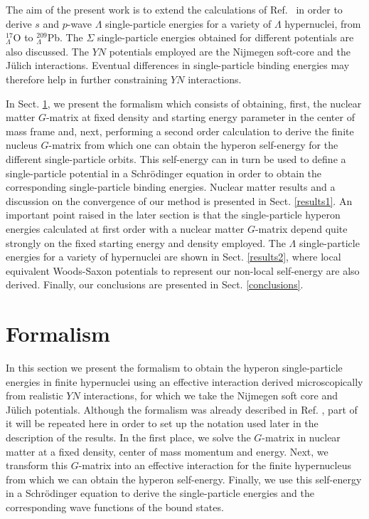 The aim of the present work is 
to extend the calculations 
of Ref.\ \cite{hjort96} in order to derive 
$s$ and $p$-wave $\Lambda$ single-particle energies for a variety of
$\Lambda$ hypernuclei, from $^{17}_{\Lambda}$O 
to $^{209}_{\Lambda}$Pb. The $\Sigma$ single-particle energies obtained for 
different potentials are also
discussed. The $YN$ potentials employed are the Nijmegen soft-core
\cite{nijmegen} and the J\"ulich \cite{juelich} interactions.
Eventual  differences in single-particle binding energies  
may therefore help in further constraining $YN$ interactions.


In Sect. \ref{formal}, we present the formalism which consists of
obtaining, first, the nuclear matter $G$-matrix at fixed density and
starting energy parameter in the center of mass frame and, next,
performing a
second order calculation to derive the finite nucleus $G$-matrix from
which one can obtain the hyperon self-energy for the different
single-particle 
orbits.
This self-energy can in turn be used to define a single-particle
potential in
a Schr\"odinger equation in order to obtain the corresponding single-particle
binding energies. Nuclear matter results and a discussion on the
convergence of our
method is presented in Sect. \ref{results1}. An important point raised in
the later section is that the single-particle hyperon energies calculated
at first order with a nuclear matter $G$-matrix depend quite strongly on 
the fixed starting energy and density employed. The $\Lambda$
single-particle 
energies for a variety of
hypernuclei are shown in Sect. \ref{results2}, where local
equivalent Woods-Saxon potentials to represent our non-local
self-energy are also derived. Finally, our conclusions are presented in
Sect. \ref{conclusions}.   




\section{Formalism}
\label{formal}
In this section we present the formalism to obtain the hyperon single-particle
energies in finite hypernuclei using an effective interaction
derived microscopically from realistic $YN$ interactions, for which we 
take the Nijmegen soft core \cite{nijmegen} and J\"ulich\cite{juelich} 
potentials. 
Although the formalism was already described in Ref. \cite{hjort96}, 
part of it will be repeated here in order to set up the notation used 
later in the description of the results.
In the first place, we solve the $G$-matrix in nuclear matter at a
fixed density, center of mass momentum and
energy. Next, we transform this $G$-matrix into an effective
interaction for the finite hypernucleus from which we can obtain the
hyperon self-energy. Finally, we use this self-energy in a Schr\"odinger
equation to derive the single-particle energies and the corresponding
wave functions of the bound states. 

